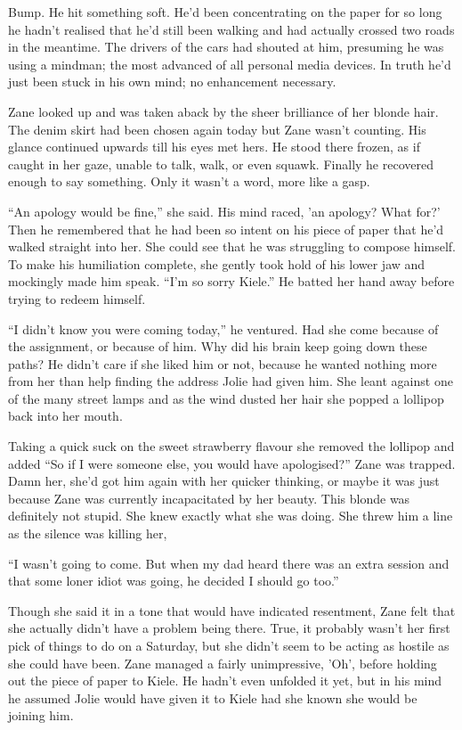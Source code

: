 Bump.  He hit something soft.  He'd been concentrating on the paper for so long he hadn't realised that he'd still been walking and had actually crossed two roads in the meantime.  The drivers of the cars had shouted at him, presuming he was using a mindman; the most advanced of all personal media devices.  In truth he'd just been stuck in his own mind; no enhancement necessary.

Zane looked up and was taken aback by the sheer brilliance of her blonde hair.  The denim skirt had been chosen again today but Zane wasn't counting.  His glance continued upwards till his eyes met hers.  He stood there frozen, as if caught in her gaze, unable to talk, walk, or even squawk.  Finally he recovered enough to say something.  Only it wasn't a word, more like a gasp.

``An apology would be fine,'' she said.  His mind raced, 'an apology?  What for?'  Then he remembered that he had been so intent on his piece of paper that he'd walked straight into her.  She could see that he was struggling to compose himself.  To make his humiliation complete, she gently took hold of his lower jaw and mockingly made him speak.  ``I'm so sorry Kiele.''  He batted her hand away before trying to redeem himself.

``I didn't know you were coming today,'' he ventured.  Had she come because of the assignment, or because of him.  Why did his brain keep going down these paths?  He didn't care if she liked him or not, because he wanted nothing more from her than help finding the address Jolie had given him.  She leant against one of the many street lamps and as the wind dusted her hair she popped a lollipop back into her mouth.  

Taking a quick suck on the sweet strawberry flavour she removed the lollipop and added ``So if I were someone else, you would have apologised?''  Zane was trapped.  Damn her, she'd got him again with her quicker thinking, or maybe it was just because Zane was currently incapacitated by her beauty.  This blonde was definitely not stupid.  She knew exactly what she was doing.  She threw him a line as the silence was killing her, 

``I wasn't going to come.  But when my dad heard there was an extra session and that some loner idiot was going, he decided I should go too.''  

Though she said it in a tone that would have indicated resentment, Zane felt that she actually didn't have a problem being there.  True, it probably wasn't her first pick of things to do on a Saturday, but she didn't seem to be acting as hostile as she could have been.  Zane managed a fairly unimpressive, 'Oh', before holding out the piece of paper to Kiele.  He hadn't even unfolded it yet, but in his mind he assumed Jolie would have given it to Kiele had she known she would be joining him.

